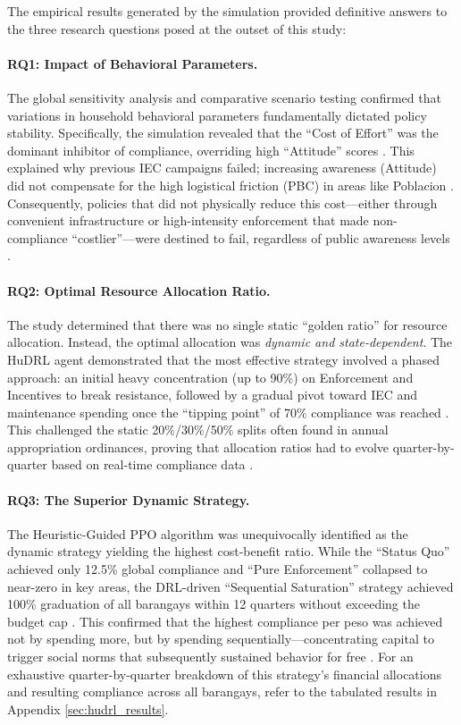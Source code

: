The empirical results generated by the simulation provided definitive answers to the three research questions posed at the outset of this study:

\paragraph{RQ1: Impact of Behavioral Parameters.}
The global sensitivity analysis and comparative scenario testing confirmed that variations in household behavioral parameters fundamentally dictated policy stability. Specifically, the simulation revealed that the ``Cost of Effort'' was the dominant inhibitor of compliance, overriding high ``Attitude'' scores \citep{Zheng2022}. This explained why previous IEC campaigns failed; increasing awareness (Attitude) did not compensate for the high logistical friction (PBC) in areas like Poblacion \citep{Moeini2023}. Consequently, policies that did not physically reduce this cost—either through convenient infrastructure or high-intensity enforcement that made non-compliance ``costlier''—were destined to fail, regardless of public awareness levels \citep{Chen2023, Badua2022}.

\paragraph{RQ2: Optimal Resource Allocation Ratio.}
The study determined that there was no single static ``golden ratio'' for resource allocation. Instead, the optimal allocation was \textit{dynamic and state-dependent}. The HuDRL agent demonstrated that the most effective strategy involved a phased approach: an initial heavy concentration (up to 90\%) on Enforcement and Incentives to break resistance, followed by a gradual pivot toward IEC and maintenance spending once the ``tipping point'' of 70\% compliance was reached \citep{Nishimura2022}. This challenged the static 20\%/30\%/50\% splits often found in annual appropriation ordinances, proving that allocation ratios had to evolve quarter-by-quarter based on real-time compliance data \citep{Abdallah2021, Torkayesh2021}.

\paragraph{RQ3: The Superior Dynamic Strategy.}
The Heuristic-Guided PPO algorithm was unequivocally identified as the dynamic strategy yielding the highest cost-benefit ratio. While the ``Status Quo'' achieved only 12.5\% global compliance and ``Pure Enforcement'' collapsed to near-zero in key areas, the DRL-driven ``Sequential Saturation'' strategy achieved 100\% graduation of all barangays within 12 quarters without exceeding the budget cap \citep{Jimenez2025}. This confirmed that the highest compliance per peso was achieved not by spending more, but by spending sequentially—concentrating capital to trigger social norms that subsequently sustained behavior for free \citep{ZhengAI2022, Andre2021}. For an exhaustive quarter-by-quarter breakdown of this strategy's financial allocations and resulting compliance across all barangays, refer to the tabulated results in Appendix \ref{sec:hudrl_results}.